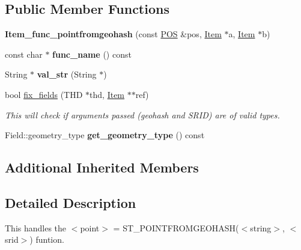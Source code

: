 \subsection*{Public Member Functions}
\begin{DoxyCompactItemize}
\item 
\mbox{\label{classItem__func__pointfromgeohash_a45136b2e3a9c188de6c17b78f630c82d}} 
{\bfseries Item\+\_\+func\+\_\+pointfromgeohash} (const \mbox{\hyperlink{structYYLTYPE}{P\+OS}} \&pos, \mbox{\hyperlink{classItem}{Item}} $\ast$a, \mbox{\hyperlink{classItem}{Item}} $\ast$b)
\item 
\mbox{\label{classItem__func__pointfromgeohash_acc14f25a895f27d32fa09bc0c17445ab}} 
const char $\ast$ {\bfseries func\+\_\+name} () const
\item 
\mbox{\label{classItem__func__pointfromgeohash_a80a8deb1a146932b0462bbd48f47b0ac}} 
String $\ast$ {\bfseries val\+\_\+str} (String $\ast$)
\item 
\mbox{\label{classItem__func__pointfromgeohash_a0140e303626da49b6f3077661e3a0d03}} 
bool \mbox{\hyperlink{classItem__func__pointfromgeohash_a0140e303626da49b6f3077661e3a0d03}{fix\+\_\+fields}} (T\+HD $\ast$thd, \mbox{\hyperlink{classItem}{Item}} $\ast$$\ast$ref)
\begin{DoxyCompactList}\small\item\em This will check if arguments passed (geohash and S\+R\+ID) are of valid types. \end{DoxyCompactList}\item 
\mbox{\label{classItem__func__pointfromgeohash_a1b7741c87475180c82d11eda307d2640}} 
Field\+::geometry\+\_\+type {\bfseries get\+\_\+geometry\+\_\+type} () const
\end{DoxyCompactItemize}
\subsection*{Additional Inherited Members}


\subsection{Detailed Description}
This handles the $<$point$>$ = S\+T\+\_\+\+P\+O\+I\+N\+T\+F\+R\+O\+M\+G\+E\+O\+H\+A\+S\+H($<$string$>$, $<$srid$>$) funtion.

